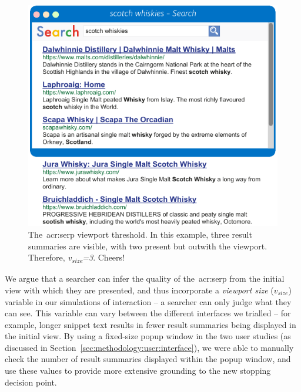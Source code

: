 \begin{figure}
    \begin{center}
    \vspace*{-9mm}
    \includegraphics[width=1\textwidth]{figures/ch6-viewport.pdf}
    \end{center}
    \vspace*{-2mm}
    \caption[Viewport cutoff example]{The~\gls{acr:serp} viewport threshold. In this example, three result summaries are visible, with two present but outwith the viewport. Therefore, \emph{v\textsubscript{size}=3}. Cheers!}
    \label{fig:viewport_cutoff}
\end{figure}

We argue that a searcher can infer the quality of the~\gls{acr:serp} from the initial view with which they are presented, and thus incorporate a \emph{viewport size} ($v_{size}$) variable in our simulations of interaction -- a searcher can only judge what they can see. This variable can vary between the different interfaces we trialled -- for example, longer snippet text results in fewer result summaries being displayed in the initial view. By using a fixed-size popup window in the two user studies (as discussed in Section~\ref{sec:methodology:user:interface}), we were able to manually check the number of result summaries displayed within the popup window, and use these values to provide more extensive grounding to the new stopping decision point.

